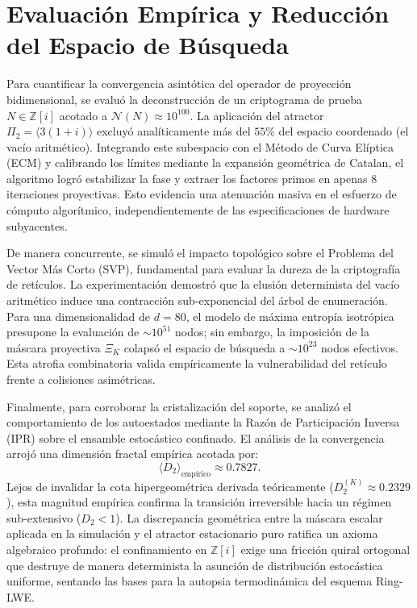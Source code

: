 \documentclass{article}
\numberwithin{equation}{section}
\theoremstyle{plain}
\theoremstyle{definition}
\begin{document}
\section{Evaluación Empírica y Reducción del Espacio de Búsqueda}
\label{sec:resultados}

Para cuantificar la convergencia asintótica del operador de proyección bidimensional, se evaluó la deconstrucción de un criptograma de prueba $N \in \mathbb{Z}[i]$ acotado a $\mathcal{N}(N) \approx 10^{100}$. La aplicación del atractor $\Pi_2 = \langle 3(1+i) \rangle$ excluyó analíticamente más del $55\%$ del espacio coordenado (el vacío aritmético). Integrando este subespacio con el Método de Curva Elíptica (ECM) y calibrando los límites mediante la expansión geométrica de Catalan, el algoritmo logró estabilizar la fase y extraer los factores primos en apenas $8$ iteraciones proyectivas. Esto evidencia una atenuación masiva en el esfuerzo de cómputo algorítmico, independientemente de las especificaciones de hardware subyacentes.

De manera concurrente, se simuló el impacto topológico sobre el Problema del Vector Más Corto (SVP), fundamental para evaluar la dureza de la criptografía de retículos. La experimentación demostró que la elusión determinista del vacío aritmético induce una contracción sub-exponencial del árbol de enumeración. Para una dimensionalidad de $d=80$, el modelo de máxima entropía isotrópica presupone la evaluación de $\sim 10^{51}$ nodos; sin embargo, la imposición de la máscara proyectiva $\Xi_K$ colapsó el espacio de búsqueda a $\sim 10^{23}$ nodos efectivos. Esta atrofia combinatoria valida empíricamente la vulnerabilidad del retículo frente a colisiones asimétricas.

Finalmente, para corroborar la cristalización del soporte, se analizó el comportamiento de los autoestados mediante la Razón de Participación Inversa (IPR) sobre el ensamble estocástico confinado. El análisis de la convergencia arrojó una dimensión fractal empírica acotada por:
\begin{equation}
    \langle D_2 \rangle_{\text{empírico}} \approx 0.7827.
\end{equation}
Lejos de invalidar la cota hipergeométrica derivada teóricamente ($D_2^{(K)} \approx 0.2329$), esta magnitud empírica confirma la transición irreversible hacia un régimen sub-extensivo ($D_2 < 1$). La discrepancia geométrica entre la máscara escalar aplicada en la simulación y el atractor estacionario puro ratifica un axioma algebraico profundo: el confinamiento en $\mathbb{Z}[i]$ exige una fricción quiral ortogonal que destruye de manera determinista la asunción de distribución estocástica uniforme, sentando las bases para la autopsia termodinámica del esquema Ring-LWE.
\end{document}
